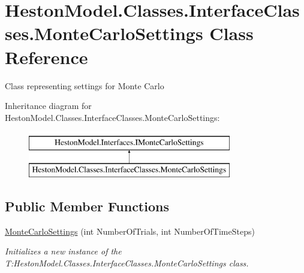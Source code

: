 \hypertarget{class_heston_model_1_1_classes_1_1_interface_classes_1_1_monte_carlo_settings}{}\section{Heston\+Model.\+Classes.\+Interface\+Classes.\+Monte\+Carlo\+Settings Class Reference}
\label{class_heston_model_1_1_classes_1_1_interface_classes_1_1_monte_carlo_settings}


Class representing settings for Monte Carlo  


Inheritance diagram for Heston\+Model.\+Classes.\+Interface\+Classes.\+Monte\+Carlo\+Settings\+:\begin{figure}[H]
\begin{center}
\leavevmode
\includegraphics[height=2.000000cm]{class_heston_model_1_1_classes_1_1_interface_classes_1_1_monte_carlo_settings}
\end{center}
\end{figure}
\subsection*{Public Member Functions}
\begin{DoxyCompactItemize}
\item 
\mbox{\hyperlink{class_heston_model_1_1_classes_1_1_interface_classes_1_1_monte_carlo_settings_a277ed89b6f5248a711b148b31eca38d0}{Monte\+Carlo\+Settings}} (int Number\+Of\+Trials, int Number\+Of\+Time\+Steps)
\begin{DoxyCompactList}\small\item\em Initializes a new instance of the T\+:\+Heston\+Model.\+Classes.\+Interface\+Classes.\+Monte\+Carlo\+Settings class. \end{DoxyCompactList}\end{DoxyCompactItemize}
